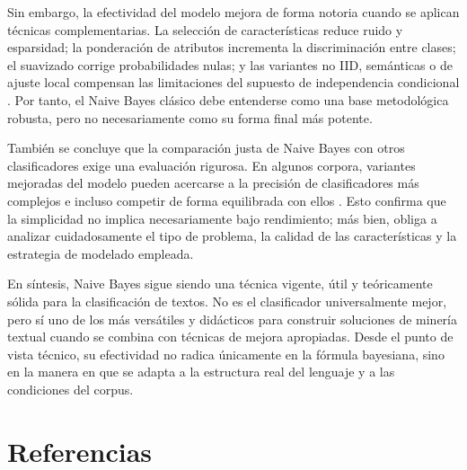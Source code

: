Sin embargo, la efectividad del modelo mejora de forma notoria cuando se aplican técnicas complementarias. La selección de características reduce ruido y esparsidad; la ponderación de atributos incrementa la discriminación entre clases; el suavizado corrige probabilidades nulas; y las variantes no IID, semánticas o de ajuste local compensan las limitaciones del supuesto de independencia condicional \cite{CHEN20095432,YOUN2009477,Jiang2016,ZHANG2016137,Ganiz20111022,Gan2021,ELHINDI2020106652}. Por tanto, el Naive Bayes clásico debe entenderse como una base metodológica robusta, pero no necesariamente como su forma final más potente.

También se concluye que la comparación justa de Naive Bayes con otros clasificadores exige una evaluación rigurosa. En algunos corpora, variantes mejoradas del modelo pueden acercarse a la precisión de clasificadores más complejos e incluso competir de forma equilibrada con ellos \cite{Kim2006,10.1145/2911451.2911547,KIM2018128}. Esto confirma que la simplicidad no implica necesariamente bajo rendimiento; más bien, obliga a analizar cuidadosamente el tipo de problema, la calidad de las características y la estrategia de modelado empleada.

En síntesis, Naive Bayes sigue siendo una técnica vigente, útil y teóricamente sólida para la clasificación de textos. No es el clasificador universalmente mejor, pero sí uno de los más versátiles y didácticos para construir soluciones de minería textual cuando se combina con técnicas de mejora apropiadas. Desde el punto de vista técnico, su efectividad no radica únicamente en la fórmula bayesiana, sino en la manera en que se adapta a la estructura real del lenguaje y a las condiciones del corpus.

\section{Referencias}

\nocite{*}

